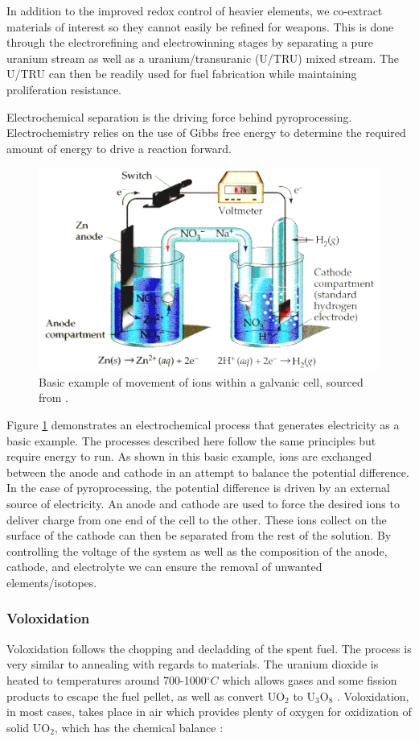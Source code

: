 In addition to the improved redox control of heavier elements, we co-extract materials of interest so they cannot easily be refined for weapons.
This is done through the electrorefining and electrowinning stages by separating a pure uranium stream as well as a uranium/transuranic (U/TRU) mixed stream. 
The U/TRU can then be readily used for fuel fabrication while maintaining proliferation resistance.

Electrochemical separation is the driving force behind pyroprocessing. Electrochemistry relies on the use of Gibbs free energy to determine the required amount of energy to drive a reaction forward.

\begin{figure}[h]
	\centering
	\includegraphics[width=0.8\linewidth]{images/electrochem}
	\caption{Basic example of movement of ions within a galvanic cell, sourced from \cite{angel}.}
	\label{fig:electrochem}
\end{figure}

Figure \ref{fig:electrochem} demonstrates an electrochemical process that generates electricity as a basic example.
The processes described here follow the same principles but require energy to run.
As shown in this basic example, ions are exchanged between the anode and cathode in an attempt to balance the potential difference.
In the case of pyroprocessing, the potential difference is driven by an external source of electricity.
An anode and cathode are used to force the desired ions to deliver charge from one end of the cell to the other.
These ions collect on the surface of the cathode can then be separated from the rest of the solution.
By controlling the voltage of the system as well as the composition of the anode, cathode, and electrolyte we can ensure the removal of unwanted elements/isotopes.


\subsubsection{Voloxidation}
Voloxidation follows the chopping and decladding of the spent fuel. The process is very similar to annealing with regards to materials. The uranium dioxide is heated to temperatures around 700-1000$^\circ C$ which allows gases and some fission products to escape the fuel pellet, as well as convert UO$_2$ to U$_3$O$_8$ \cite{organisation}. Voloxidation, in most cases, takes place in air which provides plenty of oxygen for oxidization of solid UO$_2$, which has the chemical balance \cite{jubin_spent_2009}:

